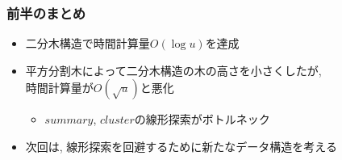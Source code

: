 \documentclass[main]{subfiles}
\begin{document}
\begin{frame}\frametitle{前半のまとめ}
	\begin{itemize}
		\item 二分木構造で時間計算量$O(\log u)$を達成
		\item 平方分割木によって二分木構造の木の高さを小さくしたが, \\
			時間計算量が$O(\sqrt{u})$と悪化
			\begin{itemize}
				\item $summary$, $cluster$の線形探索がボトルネック
			\end{itemize}
		\item 次回は, 線形探索を回避するために新たなデータ構造を考える
	\end{itemize}
\end{frame}
\end{document}
